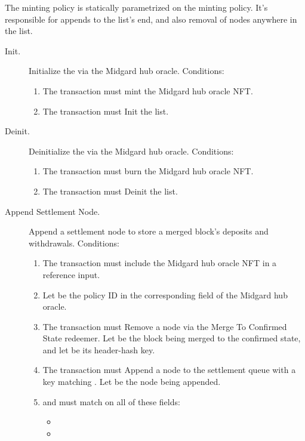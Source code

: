 \documentclass[../midgard.tex]{subfiles}
\begin{document}
The  minting policy is statically parametrized on the  minting policy.
It's responsible for appends to the  list's end, and also removal of nodes anywhere in the list.
\begin{description}
  \item[Init.] Initialize the  via the Midgard hub oracle.
    Conditions:
      \begin{enumerate}
        \item The transaction must mint the Midgard hub oracle NFT.
        \item The transaction must Init the  list.
      \end{enumerate}
  \item[Deinit.] Deinitialize the  via the Midgard hub oracle.
    Conditions:
      \begin{enumerate}
          \item The transaction must burn the Midgard hub oracle NFT.
          \item The transaction must Deinit the  list.
      \end{enumerate}
  \item[Append Settlement Node.] Append a settlement node to store a merged block's deposits and withdrawals.
    Conditions:
      \begin{enumerate}
        \item The transaction must include the Midgard hub oracle NFT in a reference input.
        \item Let  be the policy ID in the corresponding field of the Midgard hub oracle.
        \item The transaction must Remove a  node via the Merge To Confirmed State redeemer.
          Let  be the block being merged to the confirmed state, and let  be its header-hash key.
        \item The transaction must Append a node to the settlement queue with a key matching .
          Let  be the node being appended.
        \item {} and  must match on all of these fields:
          \begin{itemize}
            \item {}
            \item {}

\end{itemize}
\end{enumerate}
\end{description}
\end{document}
